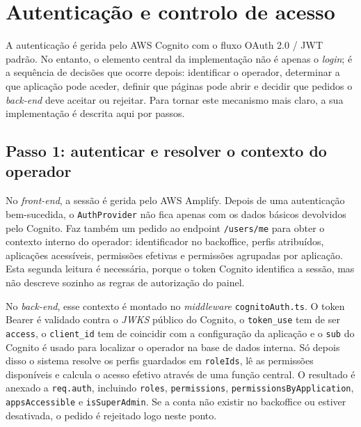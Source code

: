 
\section{Autenticação e controlo de acesso}
\label{sec:autenticacao_impl}

A autenticação é gerida pelo AWS Cognito com o fluxo OAuth 2.0 / JWT padrão. No entanto, o elemento central da implementação não é apenas o \textit{login}; é a sequência de decisões que ocorre depois: identificar o operador, determinar a que aplicação pode aceder, definir que páginas pode abrir e decidir que pedidos o \textit{back-end} deve aceitar ou rejeitar. Para tornar este mecanismo mais claro, a sua implementação é descrita aqui por passos.

\subsection{Passo 1: autenticar e resolver o contexto do operador}
\label{subsec:auth_step1}

No \textit{front-end}, a sessão é gerida pelo AWS Amplify. Depois de uma autenticação bem-sucedida, o \texttt{AuthProvider} não fica apenas com os dados básicos devolvidos pelo Cognito. Faz também um pedido ao endpoint \texttt{/users/me} para obter o contexto interno do operador: identificador no backoffice, perfis atribuídos, aplicações acessíveis, permissões efetivas e permissões agrupadas por aplicação. Esta segunda leitura é necessária, porque o token Cognito identifica a sessão, mas não descreve sozinho as regras de autorização do painel.

No \textit{back-end}, esse contexto é montado no \textit{middleware} \texttt{cognitoAuth.ts}. O token Bearer é validado contra o \textit{JWKS} público do Cognito, o \texttt{token\_use} tem de ser \texttt{access}, o \texttt{client\_id} tem de coincidir com a configuração da aplicação e o \texttt{sub} do Cognito é usado para localizar o operador na base de dados interna. Só depois disso o sistema resolve os perfis guardados em \texttt{roleIds}, lê as permissões disponíveis e calcula o acesso efetivo através de uma função central. O resultado é anexado a \texttt{req.auth}, incluindo \texttt{roles}, \texttt{permissions}, \texttt{permissionsByApplication}, \texttt{appsAccessible} e \texttt{isSuperAdmin}. Se a conta não existir no backoffice ou estiver desativada, o pedido é rejeitado logo neste ponto.

